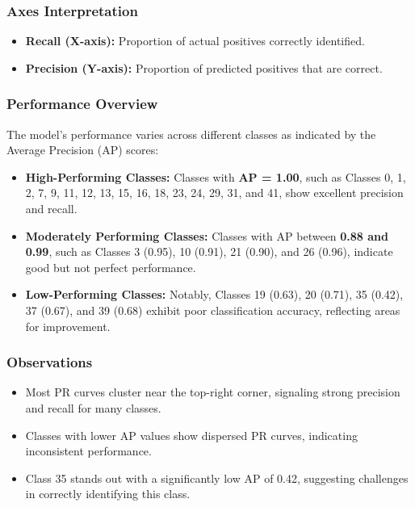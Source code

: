\subsubsection{Axes Interpretation}
\begin{itemize}
    \item \textbf{Recall (X-axis):} Proportion of actual positives correctly identified.
    \item \textbf{Precision (Y-axis):} Proportion of predicted positives that are correct.
\end{itemize}

\subsubsection{Performance Overview}

The model's performance varies across different classes as indicated by the Average Precision (AP) scores:

\begin{itemize}
    \item \textbf{High-Performing Classes:} Classes with \textbf{AP = 1.00}, such as Classes 0, 1, 2, 7, 9, 11, 12, 13, 15, 16, 18, 23, 24, 29, 31, and 41, show excellent precision and recall.
    \item \textbf{Moderately Performing Classes:} Classes with AP between \textbf{0.88 and 0.99}, such as Classes 3 (0.95), 10 (0.91), 21 (0.90), and 26 (0.96), indicate good but not perfect performance.
    \item \textbf{Low-Performing Classes:} Notably, Classes 19 (0.63), 20 (0.71), 35 (0.42), 37 (0.67), and 39 (0.68) exhibit poor classification accuracy, reflecting areas for improvement.
\end{itemize}

\subsubsection{Observations}

\begin{itemize}
    \item Most PR curves cluster near the top-right corner, signaling strong precision and recall for many classes.
    \item Classes with lower AP values show dispersed PR curves, indicating inconsistent performance.
    \item Class 35 stands out with a significantly low AP of 0.42, suggesting challenges in correctly identifying this class.
\end{itemize}

